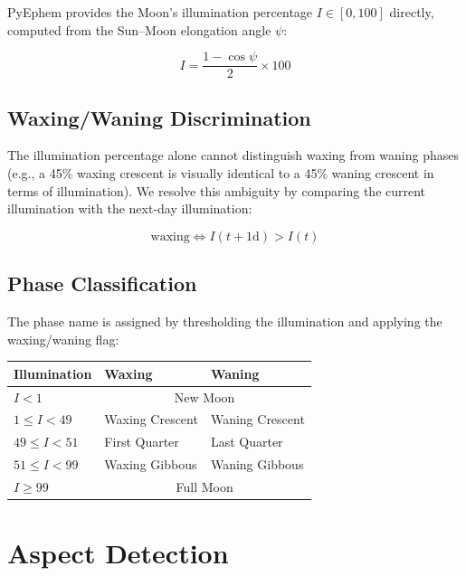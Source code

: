 \documentclass[11pt,letterpaper,twocolumn]{article}
\begin{document}
PyEphem provides the Moon's illumination percentage $I \in [0, 100]$ directly, computed from the Sun--Moon elongation angle $\psi$:

\begin{equation}
I = \frac{1 - \cos\psi}{2} \times 100
\end{equation}

\subsection{Waxing/Waning Discrimination}

The illumination percentage alone cannot distinguish waxing from waning phases (e.g., a 45\% waxing crescent is visually identical to a 45\% waning crescent in terms of illumination). We resolve this ambiguity by comparing the current illumination with the next-day illumination:

\begin{equation}
\text{waxing} \iff I(t + 1\text{d}) > I(t)
\end{equation}

\subsection{Phase Classification}

The phase name is assigned by thresholding the illumination and applying the waxing/waning flag:

\begin{center}
\begin{tabular}{lll}
\toprule
\textbf{Illumination} & \textbf{Waxing} & \textbf{Waning} \\
\midrule
$I < 1$      & \multicolumn{2}{c}{New Moon} \\
$1 \leq I < 49$   & Waxing Crescent & Waning Crescent \\
$49 \leq I < 51$  & First Quarter   & Last Quarter \\
$51 \leq I < 99$  & Waxing Gibbous  & Waning Gibbous \\
$I \geq 99$  & \multicolumn{2}{c}{Full Moon} \\
\bottomrule
\end{tabular}
\end{center}

\section{Aspect Detection}\label{sec:aspects}
\end{document}
